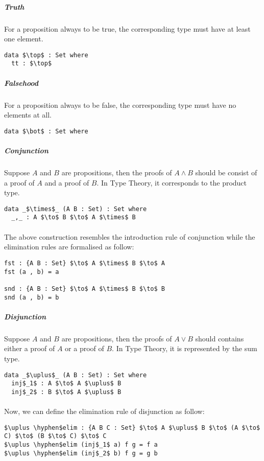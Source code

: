 \subparagraph{Truth} For a proposition always to be true, the corresponding
type must have at least one element. 
\begin{lstlisting}[mathescape=true,xleftmargin=.3\textwidth]
data $\top$ : Set where
  tt : $\top$
\end{lstlisting} 

\subparagraph{Falsehood} For a proposition always to be false, the corresponding
type must have no elements at all. 
\begin{lstlisting}[mathescape=true,xleftmargin=.3\textwidth]
data $\bot$ : Set where
\end{lstlisting} 

\subparagraph{Conjunction} Suppose \(A\) and \(B\) are propositions, then the
proofs of \(A \wedge B\) should be consist of
a proof of \(A\) and a proof of \(B\). In Type Theory, it corresponds
to the product type. 
\begin{lstlisting}[mathescape=true,xleftmargin=.3\textwidth]
data _$\times$_ (A B : Set) : Set where
  _,_ : A $\to$ B $\to$ A $\times$ B
\end{lstlisting} 

\paragraph{} The above construction resembles the introduction rule of
conjunction while the elimination rules are formalised as follow:
\begin{lstlisting}[mathescape=true,xleftmargin=.3\textwidth]
fst : {A B : Set} $\to$ A $\times$ B $\to$ A
fst (a , b) = a

snd : {A B : Set} $\to$ A $\times$ B $\to$ B
snd (a , b) = b
\end{lstlisting} 


\subparagraph{Disjunction} Suppose \(A\) and \(B\) are propositions, then the
proofs of \(A \vee B\) should contains either a proof of \(A\) or a
proof of \(B\). In Type Theory, it is represented by the sum type. 
\begin{lstlisting}[mathescape=true,xleftmargin=.3\textwidth]
data _$\uplus$_ (A B : Set) : Set where
  inj$_1$ : A $\to$ A $\uplus$ B
  inj$_2$ : B $\to$ A $\uplus$ B
\end{lstlisting} 

\paragraph{} Now, we can define the elimination rule of disjunction as
follow: 
\begin{lstlisting}[mathescape=true,xleftmargin=.2\textwidth]
$\uplus \hyphen$elim : {A B C : Set} $\to$ A $\uplus$ B $\to$ (A $\to$ C) $\to$ (B $\to$ C) $\to$ C
$\uplus \hyphen$elim (inj$_1$ a) f g = f a
$\uplus \hyphen$elim (inj$_2$ b) f g = g b
\end{lstlisting} 


